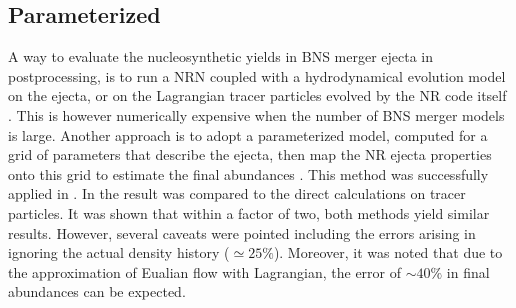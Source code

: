 \subsection{Parameterized \nuc{}}
A way to evaluate the nucleosynthetic yields in \ac{BNS} merger ejecta 
in postprocessing, is to run a \ac{NRN} coupled with a hydrodynamical 
evolution model on the ejecta, or on the Lagrangian tracer particles 
evolved by the \ac{NR} code itself 
\citep[\eg][]{Goriely:2011vg,Korobkin:2012uy,Grossman:2013lqa,Wanajo:2014wha,Just:2014fka,Martin:2015hxa}.
This is however numerically expensive when the number of \ac{BNS} 
merger models is large. 
%
Another approach is to adopt a parameterized \nuc{} model, 
computed for a grid of parameters that describe the ejecta, 
then map the \ac{NR} ejecta properties onto this grid to estimate the 
final abundances \citep{Lippuner:2015gwa}. 
%
This method was successfully applied in \citet{Radice:2016dwd,Radice:2018pdn}.
In \citet{Radice:2018pdn} the result was compared to the direct \nuc{} 
calculations on tracer particles. 
It was shown that within a factor of two, both methods yield similar results. 
However, several caveats were pointed including the errors arising in 
ignoring the actual density history (${\simeq}25\%$). Moreover, it was 
noted that due to the approximation of Eualian flow with Lagrangian, 
the error of ${\sim}40\%$ in final abundances can be expected.

